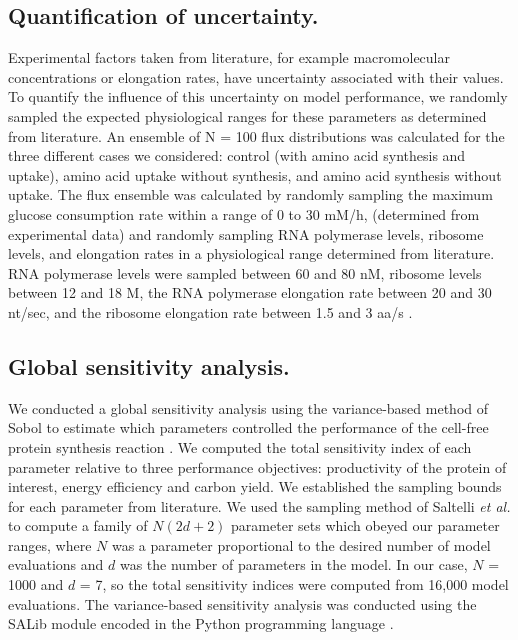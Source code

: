 \documentclass[journal=asbcd6,manuscript=article]{achemso}
\begin{document}
\subsection*{Quantification of uncertainty.}
Experimental factors taken from literature, for example macromolecular concentrations or elongation rates, have uncertainty associated with their values.
To quantify the influence of this uncertainty on model performance, we randomly sampled the expected physiological ranges for these parameters as determined from literature.
An ensemble of N = 100 flux distributions was calculated for the three different cases we considered:
control (with amino acid synthesis and uptake), amino acid uptake without synthesis, and amino acid synthesis without uptake.
The flux ensemble was calculated by randomly sampling the maximum glucose consumption rate within a range of 0 to 30 mM/h, (determined from experimental data)
and randomly sampling RNA polymerase levels, ribosome levels, and elongation rates in a physiological range determined from literature.
RNA polymerase levels were sampled between 60 and 80 nM, ribosome levels between 12 and 18 \textmu M, the RNA polymerase elongation rate between 20 and 30 nt/sec, and the ribosome elongation rate between 1.5 and 3 aa/s
\cite{2005_underwood_biotech, Garamella:2016aa}.

\subsection*{Global sensitivity analysis.}
We conducted a global sensitivity analysis using the variance-based method of Sobol to estimate which parameters controlled the performance of the cell-free protein synthesis reaction \citep{SOBOL_METHOD}.
We computed the total sensitivity index of each parameter relative to three performance objectives: productivity of the protein of interest, energy efficiency and carbon yield.
We established the sampling bounds for each parameter from literature.
We used the sampling method of Saltelli \textit{et al.} \citep{Saltelli:2010} to compute a family of $N\left(2d+2\right)$ parameter sets which obeyed our parameter ranges,
where $N$ was a parameter proportional to the desired number of model evaluations and $d$ was the number of parameters in the model. In our case, $N$ = 1000 and $d$ = 7, so the total sensitivity indices were computed from 16,000 model evaluations. The variance-based sensitivity analysis was conducted using the SALib module encoded in the Python programming language \citep{SALIB}.
\end{document}
